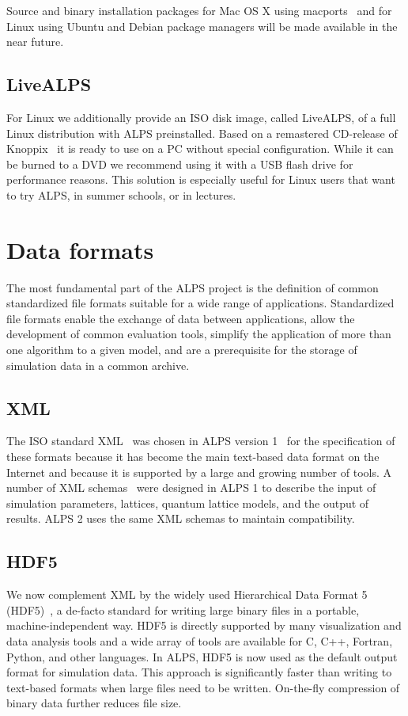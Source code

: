 \documentclass[12pt]{iopart}
\begin{document}
Source and binary installation packages for Mac OS X using macports~\cite{macports} and for Linux using Ubuntu and Debian package managers will be made available in the near future.


\subsection{LiveALPS}

For Linux we additionally provide an ISO disk image, called LiveALPS, of a full Linux distribution with ALPS preinstalled.    
Based on a remastered CD-release of Knoppix~\cite{knoppix} it is ready to use 
on a PC without special configuration. While it can be burned to a DVD we recommend using it with a USB flash drive for performance reasons.
This  solution is especially useful for Linux users that want to try ALPS, in summer schools, or in lectures.

\section{Data formats}

The most fundamental part of the ALPS project is the definition of
common standardized file formats suitable for a wide range of
applications. Standardized file formats enable the exchange of data
between applications, allow the development of common evaluation
tools, simplify the application of more than one algorithm to a given
model, and are a prerequisite for the storage of simulation data in a
common archive.

\subsection{XML}
 The ISO
standard XML~\cite{xml} was chosen in ALPS version 1~\cite{ALPS1.2,ALPS1.3} for the specification of these formats
because it has become
the main text-based data format on the Internet and because it is
supported by a large and growing number of tools.
A number of XML  schemas~\cite{xmlschema} were designed in ALPS 1 to describe the input of simulation parameters, lattices,  quantum lattice models, and the output of results. ALPS 2 uses the same XML schemas to maintain compatibility.

\subsection{HDF5}

We now complement XML by the widely used Hierarchical Data Format 5 (HDF5)~\cite{hdf5}, a de-facto standard for writing large binary files in a portable, machine-independent way.  HDF5 is directly supported by many visualization and data analysis tools and a wide array of tools are 
available for C, C++, Fortran, Python, and other languages. In ALPS, HDF5 is now used as the default output format for simulation data.  This approach is significantly faster than writing to text-based formats when large files need to be written. On-the-fly compression of binary data further reduces file size. 
\end{document}
